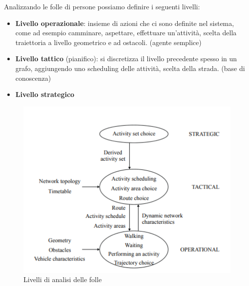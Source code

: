 Analizzando le folle di persone possiamo definire i seguenti livelli:
\begin{itemize}
    \item \textbf{Livello operazionale}: insieme di azioni che ci sono definite
          nel sistema, come ad esempio camminare, aspettare, effettuare un'attività,
          scelta della traiettoria a livello geometrico e ad ostacoli. (agente semplice)
    \item \textbf{Livello tattico} (pianifico): si discretizza il livello
          precedente spesso in un grafo, aggiungendo uno scheduling delle attività,
          scelta della strada. (base di conoscenza)
    \item \textbf{Livello strategico}
\end{itemize}
\begin{figure}
    \centering
    \includegraphics[scale=0.5]{./img/sim/levelsAnalysis.png}
    \caption{Livelli di analisi delle folle}
    \label{fig:livelli_folle}
\end{figure}

